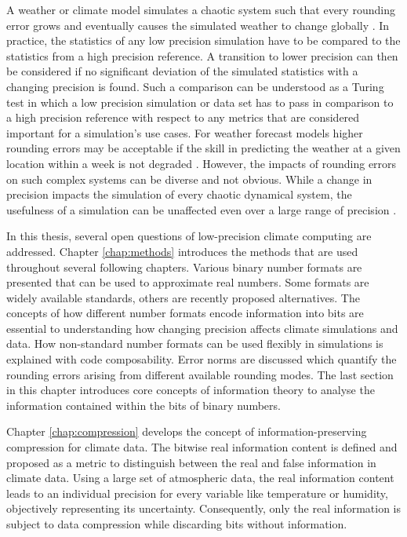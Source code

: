 A weather or climate model simulates a chaotic system such that every rounding error grows and eventually causes the
simulated weather to change globally \citep{Lorenz1963,Palmer2014b}. In practice, the statistics of any low precision
simulation have to be compared to the statistics from a high precision reference. A transition to lower precision
can then be considered if no significant deviation of the simulated statistics with a changing precision is found. Such a comparison
can be understood as a Turing test \citep{Turing1950, Baker2019} in which a low precision simulation or data set has to pass in
comparison to a high precision reference with respect to any metrics that are considered important for a simulation's use cases.
For weather forecast models higher rounding errors may be acceptable if the skill in predicting the weather at a given location within
a week is not degraded \citep{Duben2014}. However, the impacts of rounding errors on such complex systems can be diverse
and not obvious. While a change in precision impacts the simulation of every chaotic dynamical system, the usefulness of a simulation
can be unaffected even over a large range of precision \citep{Palmer2015}.

In this thesis, several open questions of low-precision climate computing are addressed. Chapter \ref{chap:methods} introduces
the methods that are used throughout several following chapters. Various binary number formats are presented that can be used
to approximate real numbers. Some formats are widely available standards, others are recently proposed alternatives.
The concepts of how different number formats encode information into bits are essential to understanding how changing
precision affects climate simulations and data. How non-standard number formats can be used flexibly in simulations
is explained with code composability. Error norms are discussed which quantify the rounding errors arising from
different available rounding modes. The last section in this chapter introduces core concepts of information theory to analyse the
information contained within the bits of binary numbers.

Chapter \ref{chap:compression} develops the concept of information-preserving compression for climate data. The bitwise real
information content is defined and proposed as a metric to distinguish between the real and false information in climate data.
Using a large set of atmospheric data, the real information content leads to an individual precision for every variable like
temperature or humidity, objectively representing its uncertainty. Consequently, only the real information is subject
to data compression while discarding bits without information.


